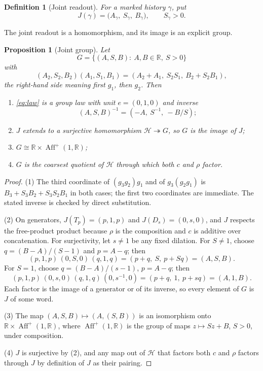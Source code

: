 \documentclass[11pt]{article}
\newtheorem{proposition}[theorem]{Proposition}
\newtheorem{definition}[theorem]{Definition}
\begin{document}
\begin{definition}[Joint readout]
For a marked history $\gamma$, put
\[
J(\gamma)=\bigl(A_\gamma,\ S_\gamma,\ B_\gamma\bigr),\qquad S_\gamma>0 .
\]
\end{definition}

The joint readout is a homomorphism, and its image is an explicit group.

\begin{proposition}[Joint group]
\label{prop:joint-group}
Let
\[
G=\bigl\{(A,S,B):\ A,B\in\mathbb R,\ S>0\bigr\}
\]
with
\begin{equation}
\label{eq:law}
(A_2,S_2,B_2)(A_1,S_1,B_1)=(A_2+A_1,\ S_2S_1,\ B_2+S_2B_1),
\end{equation}
the right-hand side meaning \emph{first} $g_1$, \emph{then} $g_2$. Then
\begin{enumerate}
\item \eqref{eq:law} is a group law with unit $e=(0,1,0)$ and inverse
\[
(A,S,B)^{-1}=(-A,\ S^{-1},\ -B/S);
\]
\item $J$ extends to a surjective homomorphism $\mathcal H\twoheadrightarrow G$,
so $G$ is the image of $J$;
\item $G\cong\mathbb R\times\operatorname{Aff}^+(1,\mathbb R)$;
\item $G$ is the coarsest quotient of $\mathcal H$ through which both $c$ and
$\rho$ factor.
\end{enumerate}
\end{proposition}

\begin{proof}
(1) The third coordinate of $(g_3g_2)g_1$ and of $g_3(g_2g_1)$ is
$B_3+S_3B_2+S_3S_2B_1$ in both cases; the first two coordinates are immediate.
The stated inverse is checked by direct substitution.

(2) On generators, $J(T_p)=(p,1,p)$ and $J(D_s)=(0,s,0)$, and $J$ respects the
free-product product because $\rho$ is the composition and $c$ is additive over
concatenation. For surjectivity, let $s\ne1$ be any fixed dilation. For
$S\ne1$, choose $q=(B-A)/(S-1)$ and $p=A-q$; then
\[
(p,1,p)\,(0,S,0)\,(q,1,q)=(p+q,\ S,\ p+Sq)=(A,S,B).
\]
For $S=1$, choose $q=(B-A)/(s-1)$, $p=A-q$; then
\[
(p,1,p)\,(0,s,0)\,(q,1,q)\,(0,s^{-1},0)=(p+q,\ 1,\ p+sq)=(A,1,B).
\]
Each factor is the image of a generator or of its inverse, so every element of
$G$ is $J$ of some word.

(3) The map $(A,S,B)\mapsto(A,(S,B))$ is an isomorphism onto
$\mathbb R\times\operatorname{Aff}^+(1,\mathbb R)$, where
$\operatorname{Aff}^+(1,\mathbb R)$ is the group of maps $z\mapsto Sz+B$,
$S>0$, under composition.

(4) $J$ is surjective by (2), and any map out of $\mathcal H$ that factors both
$c$ and $\rho$ factors through $J$ by definition of $J$ as their pairing.
\end{proof}
\end{document}

